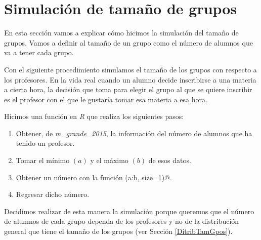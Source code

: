 


\section{Simulación de tamaño de grupos} \label{SimTamGpos}

En esta sección vamos a explicar cómo hicimos la simulación del tamaño de grupos. Vamos a definir al tamaño de un grupo como el número de alumnos que va a tener cada grupo.

Con el siguiente procedimiento simulamos el tamaño de los grupos con respecto a los profesores. En la vida real cuando un alumno decide inscribirse a una materia a cierta hora, la decisión que toma para elegir el grupo al que se quiere inscribir es el profesor con el que le gustaría tomar esa materia a esa hora.

Hicimos una función en \textit{R} que realiza los siguientes pasos:
  
  \begin{enumerate}

\item Obtener, de \textit{m\_grande\_2015}, la información del número de alumnos que ha tenido un profesor.

\item Tomar el mínimo $(a)$ y el máximo $(b)$ de esos datos.

\item Obtener un número con la función \verb@sample(a:b, size=1)@.

\item Regresar dicho número.
\end{enumerate}

Decidimos realizar de esta manera la simulación porque queremos que el número de alumnos de cada grupo dependa de los profesores y no de la distribución general que tiene el tamaño de los grupos (ver Sección \ref{DitribTamGpos}).



